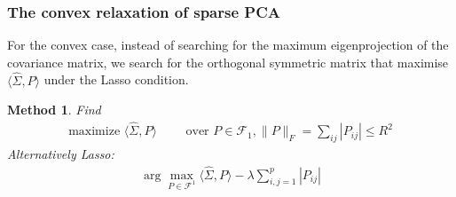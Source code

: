 \documentclass[a4paper,12pt, oneside, fleqn]{book}
\newtheorem{method}[theorem]{Method}
\theoremstyle{definition}
\theoremstyle{remark}
\begin{document}
\subsubsection*{The convex relaxation of sparse PCA}
For the convex case, instead of searching for the maximum eigenprojection of the covariance matrix, we search for the orthogonal symmetric matrix that maximise $\langle \hat{\Sigma}, P \rangle$ under the Lasso condition.
\begin{method}
Find
\begin{align*}
	\text{maximize } \langle \hat{\Sigma}, P\rangle\qquad \text{ over }
	P \in \mathcal{F}_1, \|P\|_F= \sum_{ij}|P_{ij}| \le R^2
\end{align*}
Alternatively Lasso:
\begin{align*}
		\arg\max_{P \in \mathcal{F}^1}\langle \hat{\Sigma}, P\rangle - \lambda\sum_{i, j = 1}^p|P_{ij}|
	\end{align*}
\end{method}
\end{document}
